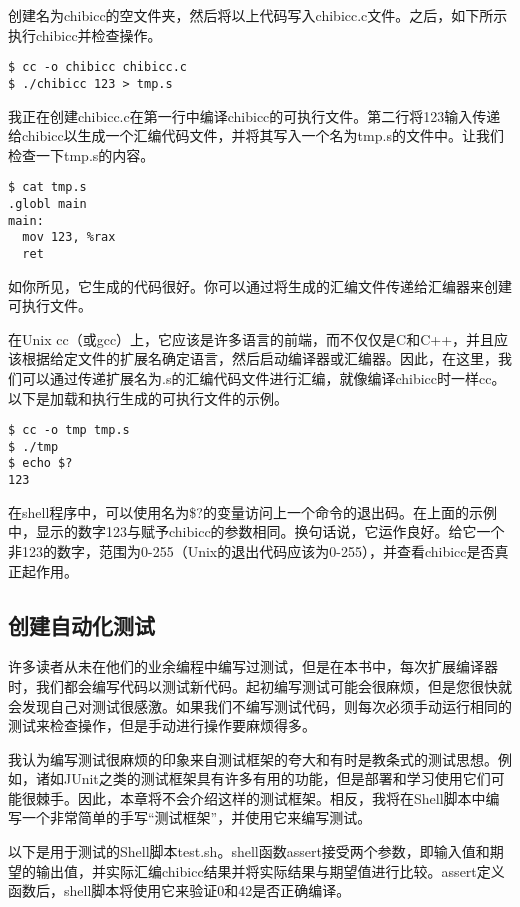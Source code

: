 \documentclass[cn,10pt,math=newtx,citestyle=gb7714-2015,bibstyle=gb7714-2015]{elegantbook}
\begin{document}
创建名为chibicc的空文件夹，然后将以上代码写入chibicc.c文件。之后，如下所示执行chibicc并检查操作。

\begin{verbatim}
$ cc -o chibicc chibicc.c
$ ./chibicc 123 > tmp.s
\end{verbatim}

我正在创建chibicc.c在第一行中编译chibicc的可执行文件。第二行将123输入传递给chibicc以生成一个汇编代码文件，并将其写入一个名为tmp.s的文件中。让我们检查一下tmp.s的内容。

\begin{verbatim}
$ cat tmp.s
.globl main
main:
  mov 123, %rax
  ret
\end{verbatim}

如你所见，它生成的代码很好。你可以通过将生成的汇编文件传递给汇编器来创建可执行文件。

在Unix cc（或gcc）上，它应该是许多语言的前端，而不仅仅是C和C++，并且应该根据给定文件的扩展名确定语言，然后启动编译器或汇编器。因此，在这里，我们可以通过传递扩展名为.s的汇编代码文件进行汇编，就像编译chibicc时一样cc。以下是加载和执行生成的可执行文件的示例。

\begin{verbatim}
$ cc -o tmp tmp.s
$ ./tmp
$ echo $?
123
\end{verbatim}

在shell程序中，可以使用名为\$?的变量访问上一个命令的退出码。在上面的示例中，显示的数字123与赋予chibicc的参数相同。换句话说，它运作良好。给它一个非123的数字，范围为0-255（Unix的退出代码应该为0-255），并查看chibicc是否真正起作用。

\subsection{创建自动化测试}

许多读者从未在他们的业余编程中编写过测试，但是在本书中，每次扩展编译器时，我们都会编写代码以测试新代码。起初编写测试可能会很麻烦，但是您很快就会发现自己对测试很感激。如果我们不编写测试代码，则每次必须手动运行相同的测试来检查操作，但是手动进行操作要麻烦得多。

我认为编写测试很麻烦的印象来自测试框架的夸大和有时是教条式的测试思想。例如，诸如JUnit之类的测试框架具有许多有用的功能，但是部署和学习使用它们可能很棘手。因此，本章将不会介绍这样的测试框架。相反，我将在Shell脚本中编写一个非常简单的手写“测试框架”，并使用它来编写测试。

以下是用于测试的Shell脚本test.sh。shell函数assert接受两个参数，即输入值和期望的输出值，并实际汇编chibicc结果并将实际结果与期望值进行比较。assert定义函数后，shell脚本将使用它来验证0和42是否正确编译。
\end{document}
